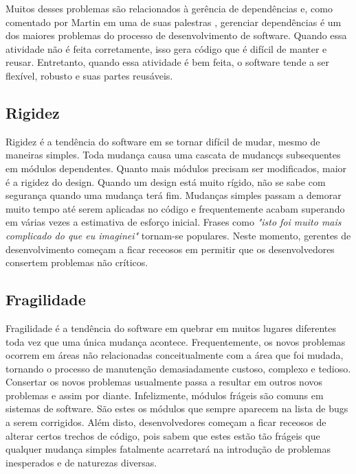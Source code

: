 Muitos desses problemas são relacionados à gerência de dependências e, como comentado por Martin em
uma de suas palestras \cite{bobmartin-infoq}, gerenciar dependências é um dos maiores problemas do processo de desenvolvimento de software.
Quando essa atividade não é feita corretamente, isso gera código que é difícil de manter e reusar. Entretanto, quando essa atividade
é bem feita, o software tende a ser flexível, robusto e suas partes reusáveis.

\subsection{Rigidez}
\label{subsec:rigidez}

Rigidez é a tendência do software em se tornar difícil de mudar, mesmo de maneiras simples. Toda mudança causa uma cascata de mudancçs subsequentes em módulos dependentes. Quanto mais módulos precisam ser modificados, maior é a rigidez do design. Quando um design está muito rígido, não se sabe com segurança quando uma mudança terá fim. Mudanças simples passam a demorar muito tempo até serem aplicadas no código e frequentemente acabam superando em várias vezes a estimativa de esforço inicial. Frases como \textit{"isto foi muito mais complicado do que eu imaginei"} tornam-se populares. Neste momento, gerentes de desenvolvimento começam a ficar receosos em permitir que os desenvolvedores consertem problemas não críticos.


\subsection{Fragilidade}
\label{subsec:fragilidade}

Fragilidade é a tendência do software em quebrar em muitos lugares diferentes toda vez que uma única mudança acontece. Frequentemente, os novos problemas ocorrem em áreas não relacionadas conceitualmente com a área que foi mudada, tornando o processo de manutenção demasiadamente custoso, complexo e tedioso. Consertar os novos problemas usualmente passa a resultar em outros novos problemas e assim por diante. Infelizmente, módulos frágeis são comuns em sistemas de software. São estes os módulos que sempre aparecem na lista de bugs a serem corrigidos. Além disto, desenvolvedores começam a ficar receosos de alterar certos trechos de código, pois sabem que estes estão tão frágeis que qualquer mudança simples fatalmente acarretará na introdução de problemas inesperados e de naturezas diversas. 


